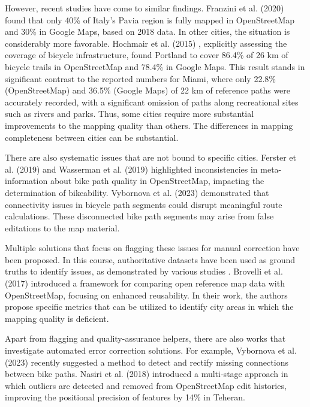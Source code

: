 However, recent studies have come to similar findings. Franzini et al. (2020) \cite{franzini_assessment_2020} found that only 40\% of Italy's Pavia region is fully mapped in OpenStreetMap and 30\% in Google Maps, based on 2018 data. In other cities, the situation is considerably more favorable. Hochmair et al. (2015) \cite{hochmair_assessing_2015}, explicitly assessing the coverage of bicycle infrastructure, found Portland to cover 86.4\% of 26 km of bicycle trails in OpenStreetMap and 78.4\% in Google Maps. This result stands in significant contrast to the reported numbers for Miami, where only 22.8\% (OpenStreetMap) and 36.5\% (Google Maps) of 22 km of reference paths were accurately recorded, with a significant omission of paths along recreational sites such as rivers and parks. Thus, some cities require more substantial improvements to the mapping quality than others. The differences in mapping completeness between cities can be substantial.

There are also systematic issues that are not bound to specific cities. Ferster et al. (2019) \cite{ferster_using_2019} and Wasserman et al. (2019) \cite{wasserman_evaluating_2019} highlighted inconsistencies in meta-information about bike path quality in OpenStreetMap, impacting the determination of bikeability. Vybornova et al. (2023) \cite{vybornova_automated_2023} demonstrated that connectivity issues in bicycle path segments could disrupt meaningful route calculations. These disconnected bike path segments may arise from false editations to the map material.

Multiple solutions that focus on flagging these issues for manual correction have been proposed. In this course, authoritative datasets have been used as ground truths to identify issues, as demonstrated by various studies \cite{haklay_how_2010, jokar_arsanjani_quality_2015, ludwig_comparison_2011}. Brovelli et al. (2017) \cite{brovelli_towards_2017} introduced a framework for comparing open reference map data with OpenStreetMap, focusing on enhanced reusability. In their work, the authors propose specific metrics that can be utilized to identify city areas in which the mapping quality is deficient.

Apart from flagging and quality-assurance helpers, there are also works that investigate automated error correction solutions. For example, Vybornova et al. (2023) \cite{vybornova_automated_2023} recently suggested a method to detect and rectify missing connections between bike paths. Nasiri et al. (2018) \cite{nasiri_improving_2018} introduced a multi-stage approach in which outliers are detected and removed from OpenStreetMap edit histories, improving the positional precision of features by 14\% in Teheran.  

